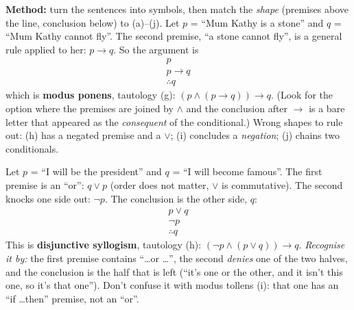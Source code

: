 \documentclass{fkt-notes}
\newcommand{\kolman}[1]{\setcounter{section}{\numexpr#1-1\relax}}
\theoremstyle{definition}
\begin{document}
\begin{example}
  \textbf{Method:} turn the sentences into symbols, then match the
  \emph{shape} (premises above the line, conclusion below) to (a)--(j).
  Let $p$ = ``Mum Kathy is a stone'' and $q$ = ``Mum Kathy cannot fly''.
  The second premise, ``a stone cannot fly'', is a general rule applied to
  her: $p\to q$. So the argument is
  \[
    \begin{array}{c} p\\ p\to q\\\hline \therefore q\end{array}
  \]
  which is \textbf{modus ponens}, tautology (g):
  $(p\wedge(p\to q))\to q$. (Look for the option where the premises are
  joined by $\wedge$ and the conclusion after $\to$ is a bare letter that
  appeared as the \emph{consequent} of the conditional.) Wrong shapes to
  rule out: (h) has a negated premise and a $\vee$; (i) concludes a
  \emph{negation}; (j) chains two conditionals.
\end{example}

\begin{example}
  Let $p$ = ``I will be the president'' and $q$ = ``I will become famous''.
  The first premise is an ``or'': $q\vee p$ (order does not matter, $\vee$ is
  commutative). The second knocks one side out: $\neg p$. The conclusion is
  the other side, $q$:
  \[
    \begin{array}{c} p\vee q\\ \neg p\\\hline \therefore q\end{array}
  \]
  This is \textbf{disjunctive syllogism}, tautology (h):
  $(\neg p\wedge(p\vee q))\to q$. \emph{Recognise it by:} the first premise
  contains ``\ldots or \ldots'', the second \emph{denies} one of the two
  halves, and the conclusion is the half that is left (``it's one or the
  other, and it isn't this one, so it's that one'').
  Don't confuse it with modus tollens (i): that one has an ``if \ldots then''
  premise, not an ``or''.
\end{example}

\kolman{3}
\end{document}
